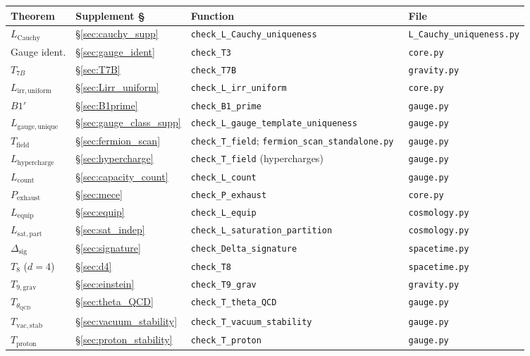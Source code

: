 \documentclass[11pt,a4paper]{article}
\theoremstyle{definition}
\begin{document}
\smallskip
\begin{center}\small
\renewcommand{\arraystretch}{1.15}
\begin{tabular}{@{}llll@{}}
\toprule
\textbf{Theorem} & \textbf{Supplement \S} & \textbf{Function} & \textbf{File} \\
\midrule
$L_{\mathrm{Cauchy}}$ & \S\ref{sec:cauchy_supp} & \texttt{check\_L\_Cauchy\_uniqueness} & \texttt{L\_Cauchy\_uniqueness.py} \\
Gauge ident. & \S\ref{sec:gauge_ident} & \texttt{check\_T3} & \texttt{core.py} \\
$T_{7B}$ & \S\ref{sec:T7B} & \texttt{check\_T7B} & \texttt{gravity.py} \\
$L_{\mathrm{irr,uniform}}$ & \S\ref{sec:Lirr_uniform} & \texttt{check\_L\_irr\_uniform} & \texttt{core.py} \\
$B1'$ & \S\ref{sec:B1prime} & \texttt{check\_B1\_prime} & \texttt{gauge.py} \\
$L_{\mathrm{gauge,unique}}$ & \S\ref{sec:gauge_class_supp} & \texttt{check\_L\_gauge\_template\_uniqueness} & \texttt{gauge.py} \\
$T_{\mathrm{field}}$ & \S\ref{sec:fermion_scan} & \texttt{check\_T\_field}; \texttt{fermion\_scan\_standalone.py}~\cite{BrookeFermionScan} & \texttt{gauge.py} \\
$L_{\mathrm{hypercharge}}$ & \S\ref{sec:hypercharge} & \texttt{check\_T\_field} (hypercharges) & \texttt{gauge.py} \\
$L_{\mathrm{count}}$ & \S\ref{sec:capacity_count} & \texttt{check\_L\_count} & \texttt{gauge.py} \\
$P_{\mathrm{exhaust}}$ & \S\ref{sec:mece} & \texttt{check\_P\_exhaust} & \texttt{core.py} \\
$L_{\mathrm{equip}}$ & \S\ref{sec:equip} & \texttt{check\_L\_equip} & \texttt{cosmology.py} \\
$L_{\mathrm{sat,part}}$ & \S\ref{sec:sat_indep} & \texttt{check\_L\_saturation\_partition} & \texttt{cosmology.py} \\
$\Delta_{\mathrm{sig}}$ & \S\ref{sec:signature} & \texttt{check\_Delta\_signature} & \texttt{spacetime.py} \\
$T_8$ ($d{=}4$) & \S\ref{sec:d4} & \texttt{check\_T8} & \texttt{spacetime.py} \\
$T_{9,\mathrm{grav}}$ & \S\ref{sec:einstein} & \texttt{check\_T9\_grav} & \texttt{gravity.py} \\
$T_{\theta_{\mathrm{QCD}}}$ & \S\ref{sec:theta_QCD} & \texttt{check\_T\_theta\_QCD} & \texttt{gauge.py} \\
$T_{\mathrm{vac,stab}}$ & \S\ref{sec:vacuum_stability} & \texttt{check\_T\_vacuum\_stability} & \texttt{gauge.py} \\
$T_{\mathrm{proton}}$ & \S\ref{sec:proton_stability} & \texttt{check\_T\_proton} & \texttt{gauge.py} \\
\bottomrule
\end{tabular}
\end{center}
\end{document}
